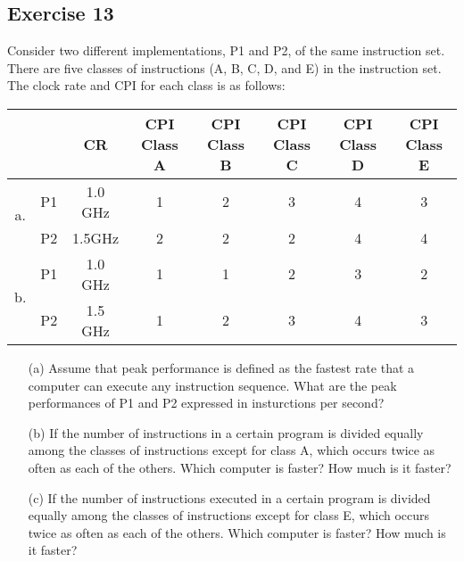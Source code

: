 \documentclass[12pt]{article}
\begin{document}
\subsection*{Exercise 13}
Consider two different implementations, P1 and P2, of the same instruction set. There are five classes of instructions (A, B, C, D, and E) in the instruction set. The clock rate and CPI for each class is as follows:
\begin{center}
\begin{tabular}{| c | c | c | c | c | c | c | c |}
\hline
\multicolumn{2}{|c|}{} & CR & CPI Class A & CPI Class B & CPI Class C & CPI Class D & CPI Class E \\
\hline
\multirow{2}{*}{a.} & P1 & 1.0 GHz & 1 & 2 & 3 & 4 & 3 \\
\cline{3-8}
& P2 & 1.5GHz & 2 & 2 & 2 & 4 & 4 \\
\hline
\multirow{2}{*}{b.} & P1 & 1.0 GHz & 1 & 1 & 2 & 3 & 2 \\
\cline{3-8}
& P2 & 1.5 GHz & 1 & 2 & 3 & 4 & 3 \\
\hline
\end{tabular}
\end{center}
\begin{itemize}
\item[(a)] Assume that peak performance is defined as the fastest rate that a computer can execute any instruction sequence. What are the peak performances of P1 and P2 expressed in insturctions per second?
\item[(b)] If the number of instructions in a certain program is divided equally among the classes of instructions except for class A, which occurs twice as often as each of the others. Which computer is faster? How much is it faster?
\item[(c)] If the number of instructions executed in a certain program is divided equally among the classes of instructions except for class E, which occurs twice as often as each of the others. Which computer is faster? How much is it faster?
\end{itemize}
\end{document}

